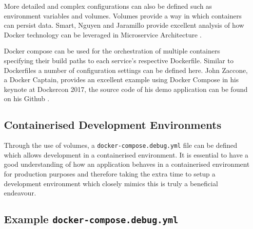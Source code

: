 More detailed and complex configurations can also be defined such as environment variables and volumes. Volumes provide a way in which containers can persist data. Smart, Nguyen and Jaramillo provide excellent analysis of how Docker technology can be leveraged in Microservice Architecture \cite{LeveragingMicroservicesArchDocker}.

Docker compose can be used for the orchestration of multiple containers specifying their build paths to each service's respective Dockerfile. Similar to Dockerfiles a number of configuration settings can be defined here. John Zaccone\cite{JohnZaccone}, a Docker Captain, provides an excellent example using Docker Compose in his keynote at Dockercon 2017, the source code of his demo application can be found on his Github \cite{dockercompose}.

\subsection{Containerised Development Environments}
Through the use of volumes, a \texttt{docker-compose.debug.yml} file can be defined which allows development in a containerised environment. It is essential to have a good understanding of how an application behaves in a containerised environment for production purposes and therefore taking the extra time to setup a development environment which closely mimics this is truly a beneficial endeavour. 

\subsection*{Example \texttt{docker-compose.debug.yml}}

